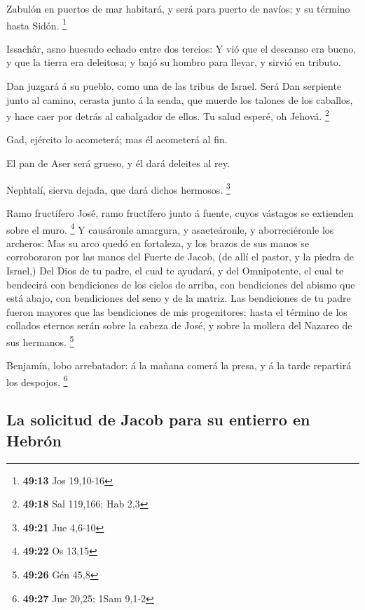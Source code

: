  Zabulón en puertos de mar habitará, y será para puerto
de navíos; y su término hasta Sidón. \footnote{\textbf{49:13} Jos
  19,10-16}

 Issachâr, asno huesudo echado entre dos tercios:
 Y vió que el descanso era bueno, y que la tierra era
deleitosa; y bajó su hombro para llevar, y sirvió en tributo.

 Dan juzgará á su pueblo, como una de las tribus de
Israel.  Será Dan serpiente junto al camino, cerasta
junto á la senda, que muerde los talones de los caballos, y hace caer
por detrás al cabalgador de ellos.  Tu salud esperé, oh
Jehová. \footnote{\textbf{49:18} Sal 119,166; Hab 2,3}

 Gad, ejército lo acometerá; mas él acometerá al fin.

 El pan de Aser será grueso, y él dará deleites al rey.

 Nephtalí, sierva dejada, que dará dichos hermosos.
\footnote{\textbf{49:21} Jue 4,6-10}

 Ramo fructífero José, ramo fructífero junto á fuente,
cuyos vástagos se extienden sobre el muro. \footnote{\textbf{49:22} Os
  13,15}  Y causáronle amargura, y asaeteáronle, y
aborreciéronle los archeros:  Mas su arco quedó en
fortaleza, y los brazos de sus manos se corroboraron por las manos del
Fuerte de Jacob, (de allí el pastor, y la piedra de Israel,)
 Del Dios de tu padre, el cual te ayudará, y del
Omnipotente, el cual te bendecirá con bendiciones de los cielos de
arriba, con bendiciones del abismo que está abajo, con bendiciones del
seno y de la matriz.  Las bendiciones de tu padre fueron
mayores que las bendiciones de mis progenitores: hasta el término de los
collados eternos serán sobre la cabeza de José, y sobre la mollera del
Nazareo de sus hermanos. \footnote{\textbf{49:26} Gén 45,8}

 Benjamín, lobo arrebatador: á la mañana comerá la presa,
y á la tarde repartirá los despojos. \footnote{\textbf{49:27} Jue 20,25;
  1Sam 9,1-2}

\hypertarget{la-solicitud-de-jacob-para-su-entierro-en-hebruxf3n}{%
\subsection{La solicitud de Jacob para su entierro en
Hebrón}\label{la-solicitud-de-jacob-para-su-entierro-en-hebruxf3n}}

